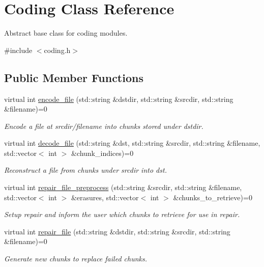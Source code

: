 \hypertarget{classCoding}{\section{\-Coding \-Class \-Reference}
\label{classCoding}
}


\-Abstract base class for coding modules.  




{\ttfamily \#include $<$coding.\-h$>$}

\subsection*{\-Public \-Member \-Functions}
\begin{DoxyCompactItemize}
\item 
virtual int \hyperlink{classCoding_a9c5c4bbea0b2395149642b7072f3f01a}{encode\-\_\-file} (std\-::string \&dstdir, std\-::string \&srcdir, std\-::string \&filename)=0
\begin{DoxyCompactList}\small\item\em \-Encode a file at srcdir/filename into chunks stored under dstdir. \end{DoxyCompactList}\item 
virtual int \hyperlink{classCoding_a2902e072d7ca62fe773b29d02c876c06}{decode\-\_\-file} (std\-::string \&dst, std\-::string \&srcdir, std\-::string \&filename, std\-::vector$<$ int $>$ \&chunk\-\_\-indices)=0
\begin{DoxyCompactList}\small\item\em \-Reconstruct a file from chunks under srcdir into dst. \end{DoxyCompactList}\item 
virtual int \hyperlink{classCoding_af1a9989e11d96009d197e19bdc9ed8bb}{repair\-\_\-file\-\_\-preprocess} (std\-::string \&srcdir, std\-::string \&filename, std\-::vector$<$ int $>$ \&erasures, std\-::vector$<$ int $>$ \&chunks\-\_\-to\-\_\-retrieve)=0
\begin{DoxyCompactList}\small\item\em \-Setup repair and inform the user which chunks to retrieve for use in repair. \end{DoxyCompactList}\item 
virtual int \hyperlink{classCoding_acb12e296a3d21fb073a88e23436724f4}{repair\-\_\-file} (std\-::string \&dstdir, std\-::string \&srcdir, std\-::string \&filename)=0
\begin{DoxyCompactList}\small\item\em \-Generate new chunks to replace failed chunks. \end{DoxyCompactList}\item 

\end{DoxyCompactItemize}
